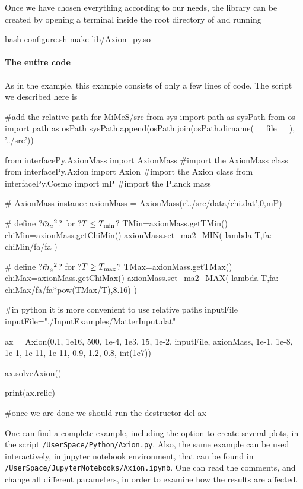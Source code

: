 \documentclass[11pt,a4paper]{article}
\begin{document}
Once we have chosen everything according to our needs, the library can be created by opening a terminal inside the root directory of \mimes and running
%
\begin{py}
	bash configure.sh
	make lib/Axion_py.so
\end{py}
%

\paragraph{The entire code}
%
As in the \CPP example, this example consists of only a few lines of code. The script we described here is
%
\begin{py}
	#add the relative path for MiMeS/src
	from sys import path as sysPath
	from os import path as osPath
	sysPath.append(osPath.join(osPath.dirname(__file__), '../src'))
	
	from interfacePy.AxionMass import AxionMass #import the AxionMass class
	from interfacePy.Axion import Axion #import the Axion class
	from interfacePy.Cosmo import mP #import the Planck mass

	# AxionMass instance
	axionMass = AxionMass(r'../src/data/chi.dat',0,mP)
	
	# define ?$\tilde m_{a}{}^2$? for ?$T\leq T_{\rm min}$?
	TMin=axionMass.getTMin() 
	chiMin=axionMass.getChiMin()
	axionMass.set_ma2_MIN( lambda T,fa: chiMin/fa/fa )

	# define ?$\tilde m_{a}{}^2$? for ?$T\geq T_{\rm max}$?
	TMax=axionMass.getTMax() 
	chiMax=axionMass.getChiMax()
	axionMass.set_ma2_MAX( lambda T,fa: chiMax/fa/fa*pow(TMax/T),8.16) )
	
	#in python it is more convenient to use relative paths
	inputFile = inputFile="./InputExamples/MatterInput.dat"  
	
	ax = Axion(0.1, 1e16, 500, 1e-4, 1e3, 15, 1e-2, inputFile, axionMass, 
	1e-1, 1e-8, 1e-1, 1e-11, 1e-11, 0.9, 1.2, 0.8, int(1e7))

	ax.solveAxion()
	
	print(ax.relic)
	
	#once we are done we should run the destructor
	del ax
\end{py} 


One can find a complete example, including the option to create several plots, in the script {\tt \mimes/UserSpace/Python/Axion.py}. Also, the same example can be used interactively, in jupyter notebook environment, that can be found in {\tt \mimes/UserSpace/JupyterNotebooks/Axion.ipynb}. One can read the comments, and change all different parameters, in order to examine how the results are affected. 
\end{document}
